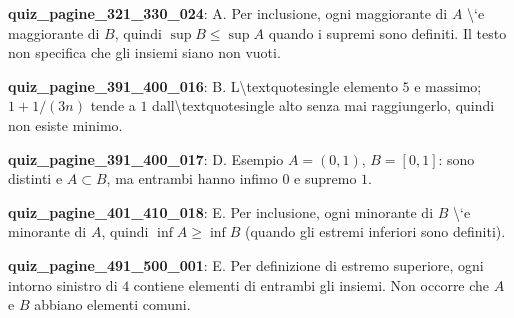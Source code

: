 \documentclass[11pt,a4paper]{article}
\newcounter{quiz}
\begin{document}
\noindent\textbf{quiz\_pagine\_321\_330\_024}: A. Per inclusione, ogni maggiorante di $A$ \textbackslash{}`e maggiorante di $B$, quindi $\sup B\leq\sup A$ quando i supremi sono definiti. Il testo non specifica che gli insiemi siano non vuoti.\par\medskip
\noindent\textbf{quiz\_pagine\_391\_400\_016}: B. L\textbackslash{}textquotesingle elemento $5$ e massimo; $1+1/(3n)$ tende a $1$ dall\textbackslash{}textquotesingle alto senza mai raggiungerlo, quindi non esiste minimo.\par\medskip
\noindent\textbf{quiz\_pagine\_391\_400\_017}: D. Esempio $A=(0,1)$, $B=[0,1]$: sono distinti e $A\subset B$, ma entrambi hanno infimo $0$ e supremo $1$.\par\medskip
\noindent\textbf{quiz\_pagine\_401\_410\_018}: E. Per inclusione, ogni minorante di $B$ \textbackslash{}`e minorante di $A$, quindi $\inf A\geq\inf B$ (quando gli estremi inferiori sono definiti).\par\medskip
\noindent\textbf{quiz\_pagine\_491\_500\_001}: E. Per definizione di estremo superiore, ogni intorno sinistro di $4$ contiene elementi di entrambi gli insiemi. Non occorre che $A$ e $B$ abbiano elementi comuni.\par\medskip
\end{document}
